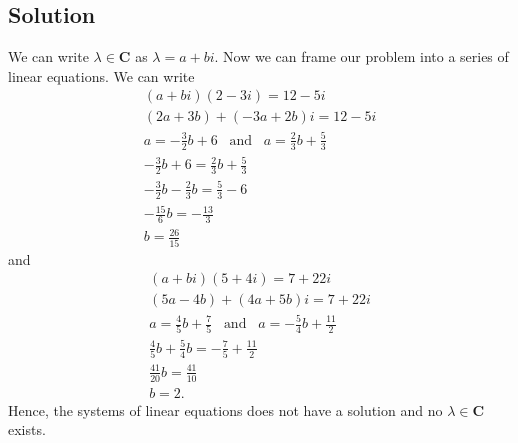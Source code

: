 \documentclass{article}
\begin{document}
\subsection*{Solution}
We can write $\lambda\in\textbf{C}$ as $\lambda=a+bi$. 
Now we can frame our problem into a series of linear equations. 
We can write 
\begin{gather*} 
    (a+bi)(2-3i)=12-5i\\
    (2a+3b)+(-3a+2b)i=12-5i\\
    a=-\frac{3}{2}b+6\;\;\;\text{and}\;\;\;a=\frac{2}{3}b+\frac{5}{3}\\
    -\frac{3}{2}b+6=\frac{2}{3}b+\frac{5}{3}\\
    -\frac{3}{2}b-\frac{2}{3}b=\frac{5}{3}-6\\
    -\frac{15}{6}b=-\frac{13}{3}\\
    b=\frac{26}{15}
\end{gather*}
and
\begin{gather*}
    (a+bi)(5+4i)=7+22i\\
    (5a-4b)+(4a+5b)i=7+22i\\
    a=\frac{4}{5}b+\frac{7}{5}\;\;\;\text{and}\;\;\;a=-\frac{5}{4}b+\frac{11}{2}\\
    \frac{4}{5}b+\frac{5}{4}b=-\frac{7}{5}+\frac{11}{2}\\
    \frac{41}{20}b=\frac{41}{10}\\
    b=2.
\end{gather*}
Hence, the systems of linear equations does not have a solution and no $\lambda\in\mathbf{C}$ exists.
\end{document}
